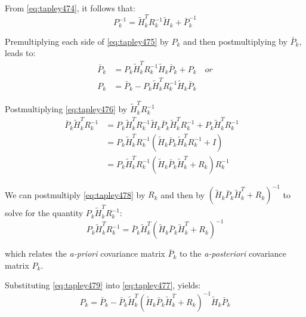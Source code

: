 From \ref{eq:tapley474}, it follows that:
\begin{equation}
  \label{eq:tapley475}
  P^{-1}_k  
    = \tilde{H}^T_k R^{-1}_k \tilde{H}_k + \bar{P}^{-1}_k
\end{equation}

Premultiplying each side of \ref{eq:tapley475} by \(P_k\) and then postmultiplying 
by \(\bar{P}_k\), leads to:
\begin{subequations}
\begin{align}
  \bar{P}_k &= 
    P_k \tilde{H}^T_k R^{-1}_k \tilde{H}_k \bar{P}_k + P_k 
      \quad or \label{eq:tapley476} \\
  P_k &= 
    \bar{P}_k - P_k \tilde{H}^T_k R^{-1}_k \tilde{H}_k \bar{P}_k 
      \label{eq:tapley477}
  \end{align}
\end{subequations}

Postmultiplying \ref{eq:tapley476} by \(\tilde{H}^T_k R^{-1}_k\)
\begin{equation}
  \label{eq:tapley478}
  \begin{aligned}
  \bar{P}_k \tilde{H}^T_k R^{-1}_k &= 
    P_k \tilde{H}^T_k R^{-1}_k \tilde{H}_k \bar{P}_k \tilde{H}^T_k R^{-1}_k +
    P_k \tilde{H}^T_k R^{-1}_k & \\
  &= P_k \tilde{H}^T_k R^{-1}_k \left(
    \tilde{H}_k \bar{P}_k \tilde{H}^T_k R^{-1}_k + I \right) & \\
  &= P_k \tilde{H}^T_k R^{-1}_k \left(
     \tilde{H}_k \bar{P}_k \tilde{H}^T_k + R_k \right) R^{-1}_k &
  \end{aligned}
\end{equation}

We can postmultiply \ref{eq:tapley478} by \(R_k\) and then by 
\(\left(\tilde{H}_k \bar{P}_k \tilde{H}^T_k + R_k \right) ^{-1} \) to solve for 
the quantity \(P_k \tilde{H}^T_k R^{-1}_k\):
\begin{equation}
\label{eq:tapley479}
P_k \tilde{H}^T_k R^{-1}_k = 
\bar{P}_k \tilde{H}^T_k \left( \tilde{H}_k \bar{P}_k \tilde{H}^T_k + R_k \right) ^{-1}
\end{equation}

which relates the \emph{a-priori} covariance matrix \(\bar{P}_k\) to the 
\emph{a-posteriori} covariance matrix \(P_k\).

Substituting \ref{eq:tapley479} into \ref{eq:tapley477}, yields:
\begin{equation}
\label{eq:tapley4710}
  P_k = 
    \bar{P}_k - \bar{P}_k \tilde{H}^T_k \left( \tilde{H}_k \bar{P}_k \tilde{H}^T_k + R_k \right) ^{-1} \tilde{H}_k \bar{P}_k 
\end{equation}

